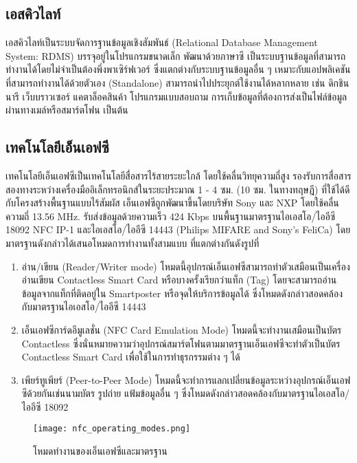 \documentclass[12pt,a4paper,twocolumn]{article}
\begin{document}
\subsection{เอสคิวไลท์}
เอสคิวไลท์เป็นระบบจัดการฐานข้อมูลเชิงสัมพันธ์ (Relational Database Management System: RDMS) บรรจุอยู่ในโปรแกรมขนาดเล็ก พัฒนาด้วยภาษาซี เป็นระบบฐานข้อมูลที่สามารถทำงานได้โดยไม่จำเป็นต้องพึ่งพาเซิร์ฟเวอร์ ซึ่งแตกต่างกับระบบฐานข้อมูลอื่น ๆ เหมาะกับแอปพลิเคชันที่สามารถทำงานได้ด้วยตัวเอง (Standalone) สามารถนำไปประยุกต์ใช้งานได้หลากหลาย เช่น ดิกชินนารี เว็บบราวเซอร์ แคตาล็อคสินค้า โปรแกรมแบบสอบถาม การเก็บข้อมูลที่ต้องการส่งเป็นไฟล์ข้อมูลผ่านทางเมล์หรือสมาร์ตโฟน เป็นต้น

\subsection{เทคโนโลยีเอ็นเอฟซี}
เทคโนโลยีเอ็นเอฟซีเป็นเทคโนโลยีสื่อสารไร้สายระยะใกล้ โดยใช้คลื่นวิทยุความถี่สูง รองรับการสื่อสารสองทางระหว่างเครื่องมืออิเล็กทรอนิกส์ในระยะประมาณ 1 - 4 ซม. (10 ซม. ในทางทฤษฎี) ที่ใช้ได้ดีกับโครงสร้างพื้นฐานแบบไร้สัมผัส เอ็นเอฟซีถูกพัฒนาขึ้นโดยบริษัท Sony และ NXP โดยใช้คลื่นความถี่ 13.56 MHz. รับส่งข้อมูลด้วยความเร็ว 424 Kbps บนพื้นฐานมาตรฐานไอเอสโอ/ไออีซี 18092 NFC IP-1 \cite{itm:prp-rfid} และไอเอสโอ/ไออีซี 14443 \cite{itm:cicc} (Philips MIFARE and Sony’s FeliCa) โดยมาตรฐานดังกล่าวได้เสนอโหมดการทำงานทั้งสามแบบ \cite{itm:IDA-Pay} ที่แตกต่างกันดังรูปที่ \cite{fig:nfc}

\begin{enumerate}
\item อ่าน/เขียน (Reader/Writer mode) โหมดนี้อุปกรณ์เอ็นเอฟซีสามารถทำตัวเสมือนเป็นเครื่องอ่านเขียน Contactless Smart Card หรือบางครั้งเรียกว่าแท็ก (Tag) โดยจะสามารถอ่านข้อมูลจากแท็กที่ติดอยู่ใน Smartposter หรือจุดให้บริการข้อมูลได้ ซึ่งโหมดดังกล่าวสอดคล้องกับมาตรฐานไอเอสโอ/ไออีซี 14443

\item เอ็นเอฟซีการ์ดอีมูเลชั่น (NFC Card Emulation Mode) โหมดนี้จะทำงานเสมือนเป็นบัตร Contactless ซึ่งนั่นหมายความว่าอุปกรณ์สมาร์ตโฟนตามมาตรฐานเอ็นเอฟซีจะทำตัวเป็นบัตร Contactless Smart Card เพื่อใช้ในการทำธุรกรรมต่าง ๆ ได้

\item เพียร์ทูเพียร์ (Peer-to-Peer Mode) โหมดนี้จะทำการแลกเปลี่ยนข้อมูลระหว่างอุปกรณ์เอ็นเอฟซีด้วยกันเช่นนามบัตร รูปถ่าย แฟ้มข้อมูลอื่น ๆ ซึ่งโหมดดังกล่าวสอดคล้องกับมาตรฐานไอเอสโอ/ไออีซี 18092
\end{enumerate}

\begin{figure}[ht!]
\centering
\texttt{[image: nfc\_operating\_modes.png]}
\caption{โหมดทำงานของเอ็นเอฟซีและมาตรฐาน} \label{fig:nfc}
\label{overflow}
\end{figure}
\end{document}
